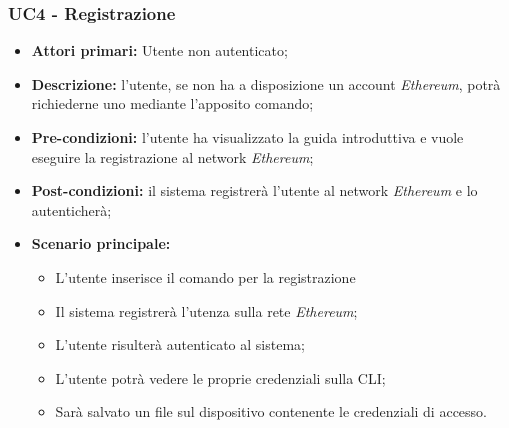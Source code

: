 \subsubsection{UC4 - Registrazione}
\begin{itemize}
	\item \textbf{Attori primari:} Utente non autenticato;
	\item \textbf{Descrizione:} l'utente, se non ha a disposizione un account \textit{Ethereum\glos}, potrà richiederne uno mediante l'apposito comando; 
	\item \textbf{Pre-condizioni:} l'utente ha visualizzato la guida introduttiva e vuole eseguire la registrazione al network \textit{Ethereum};
	\item \textbf{Post-condizioni:} il sistema registrerà l'utente al network \textit{Ethereum\glo} e lo autenticherà;
	\item \textbf{Scenario principale:} 
	\begin{itemize}
		\item L'utente inserisce il comando per la registrazione
		\item Il sistema registrerà l'utenza sulla rete \textit{Ethereum\glos};
		\item L'utente risulterà autenticato al sistema;
		\item L'utente potrà vedere le proprie credenziali sulla CLI\glos;
		\item Sarà salvato un file sul dispositivo contenente le credenziali di accesso.
	\end{itemize}
\end{itemize}